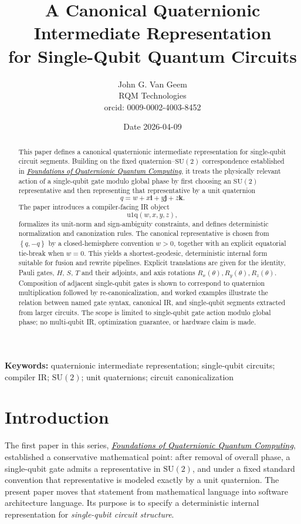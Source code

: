 \documentclass[11pt]{article}
\title{\textbf{A Canonical Quaternionic Intermediate Representation}\\
for Single-Qubit Quantum Circuits}
\author{John G. Van Geem\\
RQM Technologies\\
orcid: 0009-0002-4003-8452}
\date{Date 2026-04-09}
\theoremstyle{remark}
\newcommand{\SU}{\mathrm{SU}}
\newcommand{\ii}{\mathbf{i}}
\newcommand{\jj}{\mathbf{j}}
\newcommand{\kk}{\mathbf{k}}
\newcommand{\set}[1]{\left\{ #1 \right\}}
\newcommand{\uoneq}{\mathrm{u1q}}
\newcommand{\foundationstitle}{\href{../qqc-001-foundations/paper.pdf}{\textcolor{black}{\emph{Foundations of Quaternionic Quantum Computing}}}}
\begin{document}
\maketitle

\begin{abstract}
This paper defines a canonical quaternionic intermediate representation for
single-qubit circuit segments. Building on the fixed quaternion--$\SU(2)$
correspondence established in \foundationstitle, it treats the
physically relevant action of a single-qubit gate modulo global phase by first
choosing an $\SU(2)$ representative and then representing that representative
by a unit quaternion
\[
q = w + x\ii + y\jj + z\kk.
\]
The paper introduces a compiler-facing IR object
\[
\uoneq(w,x,y,z),
\]
formalizes its unit-norm and sign-ambiguity constraints, and defines
deterministic normalization and canonization rules. The canonical
representative is chosen from $\set{q,-q}$ by a closed-hemisphere convention
$w>0$, together with an explicit equatorial tie-break when $w=0$. This yields a
shortest-geodesic, deterministic internal form suitable for fusion and rewrite
pipelines. Explicit translations are given for the identity, Pauli gates,
$H$, $S$, $T$ and their adjoints, and axis rotations
$R_x(\theta), R_y(\theta), R_z(\theta)$. Composition of adjacent single-qubit
gates is shown to correspond to quaternion multiplication followed by
re-canonicalization, and worked examples illustrate the relation between named
gate syntax, canonical IR, and single-qubit segments extracted from larger
circuits. The scope is limited to single-qubit gate action modulo global phase;
no multi-qubit IR, optimization guarantee, or hardware claim is made.
\end{abstract}

\noindent\textbf{Keywords:} quaternionic intermediate representation; single-qubit circuits; compiler IR; $\SU(2)$; unit quaternions; circuit canonicalization

\section{Introduction}

The first paper in this series, \foundationstitle, established a
conservative mathematical point: after removal of overall phase, a single-qubit
gate admits a representative in $\SU(2)$, and under a fixed standard
convention that representative is modeled exactly by a unit quaternion. The
present paper moves that statement from mathematical language into software
architecture language. Its purpose is to specify a deterministic internal
representation for \emph{single-qubit circuit structure}.
\end{document}
